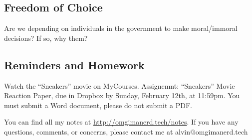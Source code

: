 \documentclass[letterpaper, 12pt]{article}
\begin{document}
\subsection*{Freedom of Choice}
Are we depending on individuals in the government to make moral/immoral
decisions? If so, why them?

\subsection*{Reminders and Homework}
Watch the ``Sneakers'' movie on MyCourses.
Assignemnt: ``Sneakers'' Movie Reaction Paper, due in Dropbox by Sunday,
February 12th, at 11:59pm. You must submit a Word document, please do not
submit a PDF.

\begin{center}
  You can find all my notes at \url{http://omgimanerd.tech/notes}. If you have
  any questions, comments, or concerns, please contact me at
  alvin@omgimanerd.tech
\end{center}
\end{document}
